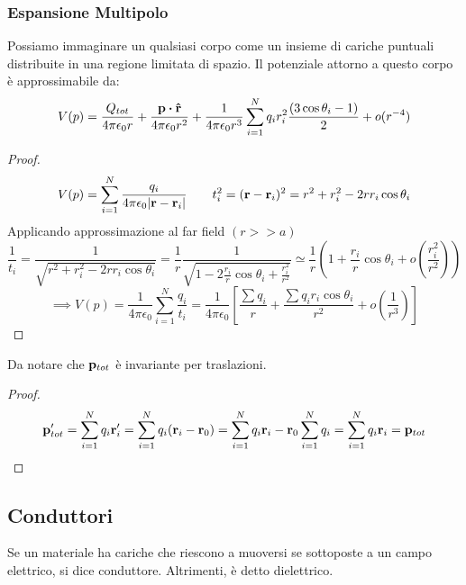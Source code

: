 \documentclass[12pt,a4paper]{article}
\begin{document}
\subsubsection{Espansione Multipolo}
Possiamo immaginare un qualsiasi corpo come un insieme di cariche puntuali distribuite in una regione limitata di spazio.
Il potenziale attorno a questo corpo è approssimabile da:
\begin{equation*}
    V(p)= \frac{Q_{tot}}{4\pi\epsilon_0 r}+ \frac{\vb{p}\vdot\vu{r}}{4\pi\epsilon_0r^2}+ \frac{1}{4\pi\epsilon_0r^3}
    \sum_{i=1}^{N} q_i r_i^2\frac{(3 \cos\theta_i-1)}{2} + o(r^{-4})
\end{equation*}
\begin{proof}
    \begin{equation*}
        V(p)= \sum_{i=1}^{N} \frac{q_i}{4\pi\epsilon_0\abs{\vb{r}-\vb{r}_i}} 
        \quad \quad t_i^2= (\vb{r}-\vb{r}_i)^2= r^2+r_i^2-2rr_i\cos \theta_i
    \end{equation*}
    Applicando approssimazione al far field $(r>>a)$
    \begin{equation*}
        \frac{1}{t_i}= \frac{1}{\sqrt{r^2+r_i^2-2rr_i\cos \theta_i}}= \frac{1}{r}\frac{1}{\sqrt{1-2\frac{r_i}{r}\cos \theta_i + \frac{r_i^2}{r^2}}}
        \simeq\frac{1}{r}\left( 1+ \frac{r_i}{r}\cos \theta_i +o(\frac{r_i^2}{r^2})\right)
    \end{equation*}
    \begin{equation*}
        \implies V(p)= \frac{1}{4\pi\epsilon_0}\sum_{i=1}^{N} \frac{q_i}{t_i}= \frac{1}{4\pi\epsilon_0} \left[ \frac{\sum q_i}{r}+\frac{\sum q_ir_i \cos \theta_i}{r^2} + o(\frac{1}{r^3})\right]
    \end{equation*}
\end{proof}

Da notare che $ \vb{p}_{tot} $ è invariante per traslazioni.
\begin{proof}
    \begin{equation*}
    \vb{p}'_{tot}= \sum_{i=1}^{N} q_i\vb{r}'_i= \sum_{i=1}^{N} q_i(\vb{r}_i-\vb{r}_0)= \sum_{i=1}^{N} q_i\vb{r}_i-\vb{r}_0\sum_{i=1}^{N}q_i
    =\sum_{i=1}^{N}q_i\vb{r}_i= \vb{p}_{tot}
    \end{equation*}
\end{proof}

\subsection{Conduttori}
\begin{definition}
    Se un materiale ha cariche che riescono a muoversi se sottoposte a un campo elettrico, si dice conduttore. Altrimenti, è detto dielettrico.
\end{definition}
\end{document}
